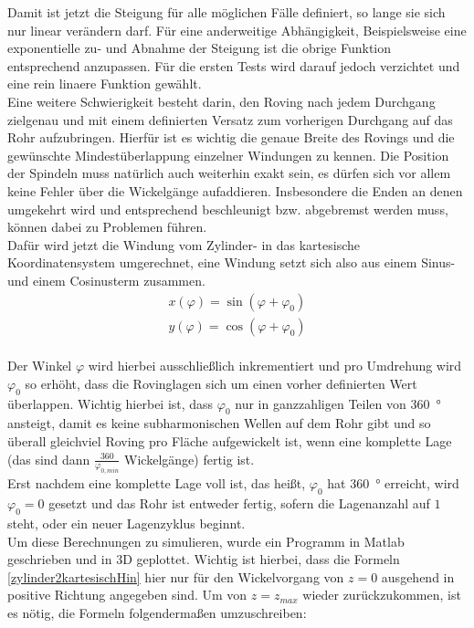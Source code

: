 \documentclass[paper=A4,pagesize,DIV=18, 12pt,listof=totoc,bibliography=totoc,headings=optiontohead,open=any]{article}
\begin{document}
Damit ist jetzt die Steigung für alle möglichen Fälle definiert, so lange sie sich nur linear verändern darf. Für eine anderweitige Abhängigkeit, Beispielsweise eine exponentielle zu- und Abnahme der Steigung ist die obrige Funktion entsprechend anzupassen. Für die ersten Tests wird darauf jedoch verzichtet und eine rein linaere Funktion gewählt.\\
Eine weitere Schwierigkeit besteht darin, den Roving nach jedem Durchgang zielgenau und mit einem definierten Versatz zum vorherigen Durchgang auf das Rohr aufzubringen. Hierfür ist es wichtig die genaue Breite des Rovings und die gewünschte Mindestüberlappung einzelner Windungen zu kennen. Die Position der Spindeln muss natürlich auch weiterhin exakt sein, es dürfen sich vor allem keine Fehler über die Wickelgänge aufaddieren. Insbesondere die Enden an denen umgekehrt wird und entsprechend beschleunigt bzw. abgebremst werden muss, können dabei zu Problemen führen.\\
Dafür wird jetzt die Windung vom Zylinder- in das kartesische Koordinatensystem umgerechnet, eine Windung setzt sich also aus einem Sinus- und einem Cosinusterm zusammen.\\
\begin{eqnarray}\label{zylinder2kartesischHin}
	x(\varphi) = \sin(\varphi + \varphi_0)\\
	y(\varphi) = \cos(\varphi + \varphi_0)
\end{eqnarray}\\
Der Winkel $\varphi$ wird hierbei ausschließlich inkrementiert und pro Umdrehung wird $\varphi_0$ so erhöht, dass die Rovinglagen sich um einen vorher definierten Wert überlappen. Wichtig hierbei ist, dass $\varphi_0$ nur in ganzzahligen Teilen von \SI{360}{\degree} ansteigt, damit es keine subharmonischen Wellen auf dem Rohr gibt und so überall gleichviel Roving pro Fläche aufgewickelt ist, wenn eine komplette Lage (das sind dann $\frac{360}{\varphi_{0,min}}$ Wickelgänge) fertig ist.\\
Erst nachdem eine komplette Lage voll ist, das heißt, $\varphi_0$ hat \SI{360}{\degree} erreicht, wird $\varphi_0 = 0$ gesetzt und das Rohr ist entweder fertig, sofern die Lagenanzahl auf $1$ steht, oder ein neuer Lagenzyklus beginnt.\\
Um diese Berechnungen zu simulieren, wurde ein Programm in Matlab geschrieben und in 3D geplottet. Wichtig ist hierbei, dass die Formeln \eqref{zylinder2kartesischHin} hier nur für den Wickelvorgang von $z = 0$ ausgehend in positive Richtung angegeben sind. Um von $z = z_{max}$ wieder zurückzukommen, ist es nötig, die Formeln folgendermaßen umzuschreiben:\\
\end{document}

